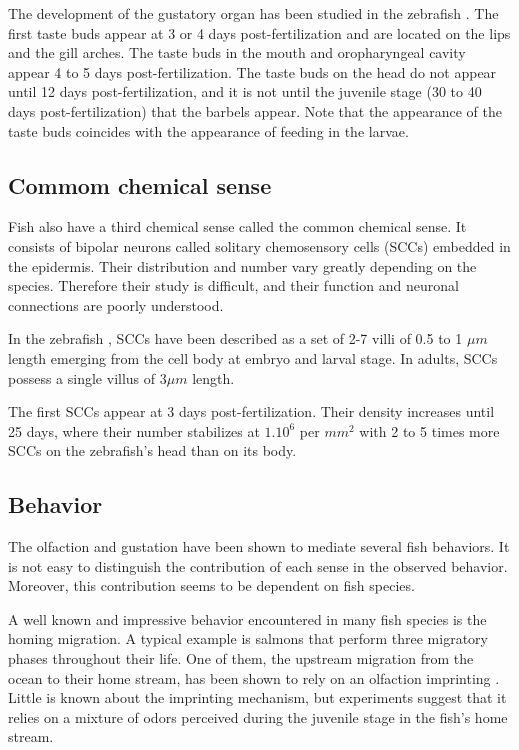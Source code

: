     The development of the gustatory organ has been studied in the zebrafish \cite{hansen2002taste}. The first taste buds appear at 3 or 4 days post-fertilization and are located on the lips and the gill arches. The taste buds in the mouth and oropharyngeal cavity appear 4 to 5 days post-fertilization. The taste buds on the head do not appear until 12 days post-fertilization, and it is not until the juvenile stage (30 to 40 days post-fertilization) that the barbels appear. Note that the appearance of the taste buds coincides with the appearance of feeding in the larvae.

    \subsection{Commom  chemical sense}
    Fish also have a third chemical sense called the common chemical sense. It consists of bipolar neurons called solitary chemosensory cells (SCCs) embedded in the epidermis. Their distribution and number vary greatly depending on the species. Therefore their study is difficult, and their function and neuronal connections are poorly understood.

    In the zebrafish \cite{kotrschal1997ontogeny}, SCCs have been described as a set of 2-7 villi of 0.5 to 1 $\mu m$ length emerging from the cell body at embryo and larval stage.  In adults, SCCs possess a single villus of $3\mu m$ length.

    The first SCCs appear at 3 days post-fertilization. Their density increases until 25 days, where their number stabilizes at $1.10^6$ per $mm^2$ with 2 to 5 times more SCCs on the zebrafish's head than on its body.

    \subsection{Behavior}
    The olfaction and gustation have been shown to mediate several fish behaviors. It is not easy to distinguish the contribution of each sense in the observed behavior. Moreover, this contribution seems to be dependent on fish species.

    A well known and impressive behavior encountered in many fish species is the homing migration. A typical example is salmons that perform three migratory phases throughout their life. One of them, the upstream migration from the ocean to their home stream, has been shown to rely on an olfaction imprinting \cite{stabell1992olfactory,hasler1983olfactory}. Little is known about the imprinting mechanism, but experiments suggest that it relies on a mixture of odors perceived during the juvenile stage in the fish's home stream.

